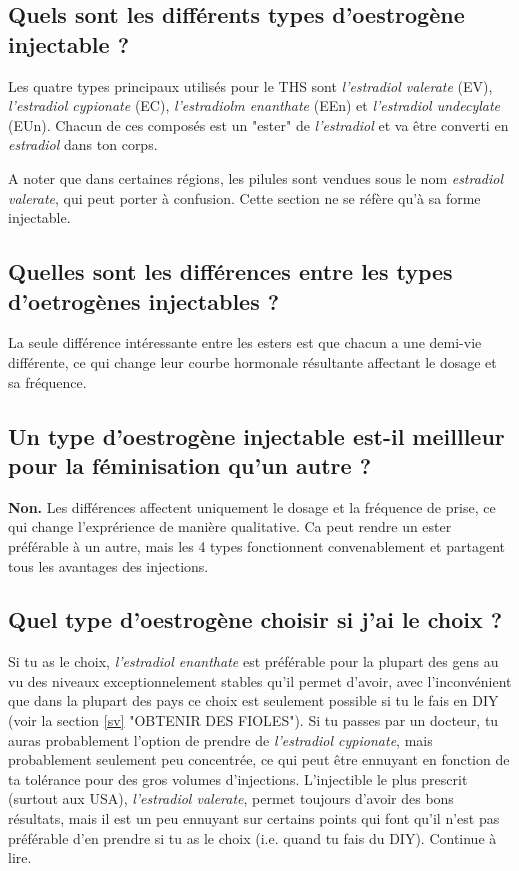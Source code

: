 \documentclass{article}
\begin{document}
\subsection{Quels sont les différents types d'oestrogène injectable ?}

Les quatre types principaux utilisés pour le THS sont \textit{l'estradiol valerate} (EV), \textit{l'estradiol cypionate} (EC), \textit{l'estradiolm enanthate} (EEn) et \textit{l'estradiol undecylate} (EUn). Chacun de ces composés est un "ester" de \textit{l'estradiol} et va être converti en \textit{estradiol} dans ton corps.

A noter que dans certaines régions, les pilules sont vendues sous le nom \textit{estradiol valerate}, qui peut porter à confusion. Cette section ne se réfère qu'à sa forme injectable.

\subsection{Quelles sont les différences entre les types d'oetrogènes injectables ?}

La seule différence intéressante entre les esters est que chacun a une demi-vie différente, ce qui change leur courbe hormonale résultante affectant le dosage et sa fréquence.

\subsection{Un type d'oestrogène injectable est-il meillleur pour la féminisation qu'un autre ?}

\textbf{Non.} Les différences affectent uniquement le dosage et la fréquence de prise, ce qui change l'exprérience de manière qualitative. Ca peut rendre un ester préférable à un autre, mais les 4 types fonctionnent convenablement et partagent tous les avantages des injections.

\subsection{Quel type d'oestrogène choisir si j'ai le choix ?}

Si tu as le choix, \textit{l'estradiol enanthate} est préférable pour la plupart des gens au vu des niveaux exceptionnelement stables qu'il permet d'avoir, avec l'inconvénient que dans la plupart des pays ce choix est seulement possible si tu le fais en DIY (voir la section \ref{sv} "OBTENIR DES FIOLES"). Si tu passes par un docteur, tu auras probablement l'option de prendre de \textit{l'estradiol cypionate}, mais probablement seulement peu concentrée, ce qui peut être ennuyant en fonction de ta tolérance pour des gros volumes d'injections. L'injectible le plus prescrit (surtout aux USA), \textit{l'estradiol valerate}, permet toujours d'avoir des bons résultats, mais il est un peu ennuyant sur certains points qui font qu'il n'est pas préférable d'en prendre si tu as le choix (i.e. quand tu fais du DIY). Continue à lire.
\end{document}
